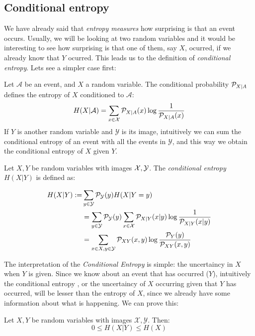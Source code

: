 \subsection*{Conditional entropy}
We have already said that \emph{entropy measures} how surprising is that an event occurs. Usually, we will be looking at two random variables and it would be interesting to see how surprising is that one of them, say $X$, ocurred, if we already know that $Y$ ocurred. This leads us to the definition of \emph{conditional entropy}. Lets see a simpler case first:

Let $\mathcal A$ be an event, and $X$ a random variable. The conditional probability $\mathcal{P}_{X|A}$ defines the entropy of $X$ conditioned to $\mathcal A$:
$$
H(X|\mathcal A) = \sum_{x \in \mathcal{X}} \mathcal{P}_{X|A}(x) \log\frac{1}{\mathcal{P}_{X|A}(x)}
$$
If $Y$ is another random variable and $\mathcal Y$ is its image, intuitively we can sum the conditional entropy of an event with all the events in $\mathcal Y$, and this way we obtain the conditional entropy of $X$ given $Y$.
\begin{ndef}
Let $X,Y$ be random variables with images $\mathcal{X},\mathcal Y$. The \emph{conditional entropy} $H(X | Y)$ is defined as:

\begin{equation*}
        \begin{split}
    H(X|Y) :=  & \sum_{y \in \mathcal Y} \mathcal{P}_{\mathcal Y}(y) H(X| Y = y)  \\ 
    & = \sum_{y \in \mathcal Y} \mathcal{P}_{\mathcal  Y}(y) \sum_{x \in \mathcal{X}} \mathcal{P}_{X | Y}(x|y)\log\frac{1}{\mathcal{P}_{X|Y}(x|y)}  \\
   & = \sum_{x \in X,y \in \mathcal Y}\mathcal{P}_{XY}(x,y)\log\frac{\mathcal{P}_Y(y)}{\mathcal{P}_{XY}(x,y)}
\end{split}
\end{equation*}



\end{ndef}
The interpretation of the \emph{Conditional Entropy} is simple: the uncertaincy in $X$ when $Y$ is given. Since we know about an event that has occurred ($Y$), intuitively the conditional entropy , or the uncertaincy of $X$ occurring given that $Y$ has occurred, will be lesser than the entropy of $X$, since we already have some information about what is happening. We can prove this:

\begin{nprop}
Let $X,Y$ be random variables with images $\mathcal X, \mathcal Y$. Then:
$$
0 \leq H(X|Y) \leq H(X)
$$
\end{nprop}


